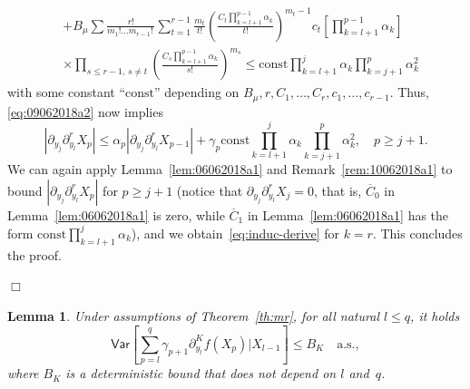 \documentclass[bj]{imsart}
\newcommand{\proofendsign}{$\Box$}
\newtheorem{lem}[thm]{Lemma}
\newenvironment{proof}{{\noindent \bf Proof }}
 {{\hspace*{\fill}\proofendsign\par\bigskip}}
\newcommand*{\const}{\mathrm{const}}
\newcommand*{\ol}{\overline}
\begin{document}
\begin{proof}
\begin{align*}
&+B_{\mu}\sum\frac{r!}{m_{1}!\ldots m_{r-1}!\,}\sum_{t=1}^{r-1}\frac{m_t}{t!}\left(\frac{C_{t}\prod_{k=l+1}^{p-1}\alpha_{k}}{t!}\right)^{m_{t}-1}c_t\left[\prod_{k=l+1}^{p-1}\alpha_{k}\right]
\\
&\times \prod_{s\le r-1,\,s\neq t}\left(\frac{C_{s}\prod_{k=l+1}^{p-1}\alpha_{k}}{s!}\right)^{m_{s}}\leq \const\prod_{k=l+1}^{j}\alpha_{k}\prod_{k=j+1}^{p}\alpha_{k}^{2}
\end{align*}
with some constant ``$\const$'' depending on
$B_\mu,r,C_1,\ldots,C_r,c_1,\ldots,c_{r-1}$.
Thus, \eqref{eq:09062018a2} now implies
$$
|\partial_{y_{j}}\partial_{y_{l}}^{r}X_{p}|
\le\alpha_p|\partial_{y_{j}}\partial_{y_{l}}^{r}X_{p-1}|
+\gamma_p \const\prod_{k=l+1}^{j}\alpha_{k}\prod_{k=j+1}^{p}\alpha_{k}^{2},
\quad p\ge j+1.
$$
We can again apply Lemma~\ref{lem:06062018a1}
and Remark~\ref{rem:10062018a1}
to bound $|\partial_{y_{j}}\partial_{y_{l}}^r X_{p}|$
for $p\ge j+1$
(notice that $\partial_{y_j}\partial_{y_l}^r X_j=0$, that is,
$\ol C_0$ in Lemma~\ref{lem:06062018a1} is zero,
while $\ol C_1$ in Lemma~\ref{lem:06062018a1}
has the form $\const\prod_{k=l+1}^j \alpha_k$),
and we obtain~\eqref{eq:induc-derive} for $k=r$.
This concludes the proof.
\end{proof}

\begin{lem}
\label{lem:var_poincare}
Under assumptions of Theorem~\ref{th:mr},
for all natural $l\le q$, it holds
$$
\mathsf{Var}\left[\sum_{p=l}^{q}\gamma_{p+1}\partial_{y_{l}}^{K}f\left(X_{p}\right)\Big|X_{l-1}\right]\le B_K\quad\text{a.s.},
$$
where $B_K$ is a deterministic bound that does not depend on $l$ and~$q$.
\end{lem}
\end{document}
